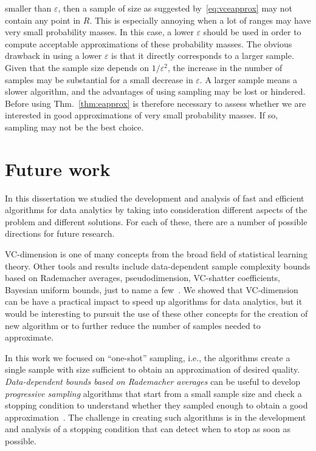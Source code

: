 \begin{itemize}
    smaller than $\varepsilon$, then a sample of size as suggested
    by~\eqref{eq:vceapprox} may not contain any point in $R$. This is especially annoying when a lot
    of ranges may have very small probability masses. In this case, a lower
    $\varepsilon$ should be used in order to compute acceptable approximations
    of these probability masses. The obvious drawback in using a lower
    $\varepsilon$ is that it directly corresponds to a larger sample. Given that
    the sample size depends on $1/\varepsilon^2$, the increase in the number of
    samples may be substantial for a small decrease in $\varepsilon$. A larger
    sample means a slower algorithm, and the advantages of using sampling may be
    lost or hindered. Before using Thm.~\ref{thm:eapprox} is therefore
    necessary to assess whether we are interested in good approximations of very
    small probability masses. If so, sampling may not be the best choice.
\end{itemize}

\section*{Future work} 
In this dissertation we studied the development and analysis of fast and
efficient algorithms for data analytics by taking into consideration different
aspects of the problem and different solutions. For each of these, there are a
number of possible directions for future research.

VC-dimension is one of many concepts from the broad field of statistical
learning theory. Other tools and results include data-dependent sample
complexity bounds based on Rademacher averages, pseudodimension, VC-shatter
coefficients, Bayesian uniform bounds, just to name a
few~\citep{BoucheronBL05,AnthonyB99,DevroyeGL96}. We showed that VC-dimension
can be have a practical impact to speed up algorithms for data analytics, but it
would be interesting to pursuit the use of these other concepts for the creation
of new algorithm or to further reduce the number of samples needed to
approximate. 

In this work we focused on ``one-shot'' sampling, i.e., the algorithms create a
single sample with size sufficient to obtain an approximation of desired
quality. \emph{Data-dependent bounds based on Rademacher averages} can be
useful to develop \emph{progressive sampling} algorithms that start from a small
sample size and check a stopping condition to understand whether they sampled
enough to obtain a good approximation~\citep{ElomaaK02,Kaariainen04}. The
challenge in creating such algorithms is in the development and analysis of a
stopping condition that can detect when to stop as soon as possible.  

